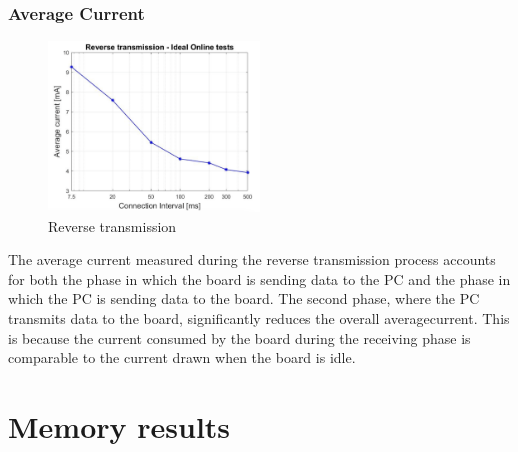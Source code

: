 \documentclass{Configuration_Files/PoliMi3i_thesis}
\begin{document}
\subsubsection*{Average Current}

\begin{figure}[H]
    \centering
    \includegraphics[width=0.5\textwidth]{Results Manuel/figure40}
    \caption{Reverse transmission}
    \label{manuel_results_40}
\end{figure}

The average current measured during the reverse transmission process accounts for both the phase in which the board is sending data to the PC and the phase in which the PC is sending data to the board. The second phase, where the PC transmits data to the board, significantly reduces the overall averagecurrent. This is because the current consumed by the board during the receiving phase is comparable to the current drawn when the board is idle.


\section{Memory results}
\end{document}
